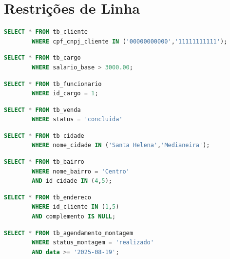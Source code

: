 \documentclass[
12pt,
a4paper,
semrecuonosumario,
sumario = abnt-6027-2012]{report}
\begin{document}
    \section{Restrições de Linha}

    \begin{lstlisting}[language=SQL,caption={SELECT -- Tabela\texttt{tb\_cliente}}]
        SELECT * FROM tb_cliente
        WHERE cpf_cnpj_cliente IN ('00000000000','11111111111');
    \end{lstlisting}

    \begin{lstlisting}[language=SQL,caption={SELECT -- Tabela \texttt{tb\_cargo}}]
        SELECT * FROM tb_cargo
        WHERE salario_base > 3000.00;
    \end{lstlisting}

    \begin{lstlisting}[language=SQL,caption={SELECT -- Tabela \texttt{tb\_funcionario}}]
        SELECT * FROM tb_funcionario
        WHERE id_cargo = 1;
    \end{lstlisting}

    \begin{lstlisting}[language=SQL,caption={SELECT -- Tabela \texttt{tb\_venda}}]
        SELECT * FROM tb_venda
        WHERE status = 'concluida'
    \end{lstlisting}

    \begin{lstlisting}[language=SQL,caption={SELECT -- Tabela \texttt{tb\_cidade}}]
        SELECT * FROM tb_cidade
        WHERE nome_cidade IN ('Santa Helena','Medianeira');
    \end{lstlisting}

    \begin{lstlisting}[language=SQL,caption={SELECT -- Tabela \texttt{tb\_bairro}}]
        SELECT * FROM tb_bairro
        WHERE nome_bairro = 'Centro'
        AND id_cidade IN (4,5);
    \end{lstlisting}

    \begin{lstlisting}[language=SQL,caption={SELECT -- Tabela \texttt{tb\_endereco}}]
        SELECT * FROM tb_endereco
        WHERE id_cliente IN (1,5)
        AND complemento IS NULL;
    \end{lstlisting}

    \begin{lstlisting}[language=SQL,caption={SELECT -- Tabela \texttt{tb\_agendamento\_montagem}}]
        SELECT * FROM tb_agendamento_montagem
        WHERE status_montagem = 'realizado'
        AND data >= '2025-08-19';
    \end{lstlisting}
\end{document}
